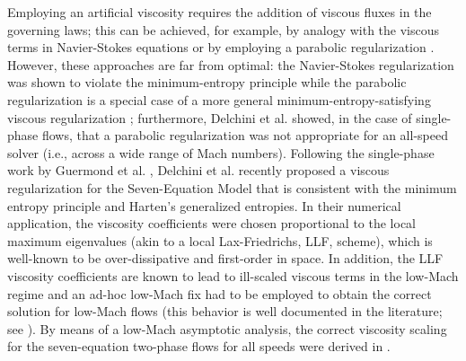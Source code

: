 \documentclass[preprint,10pt]{elsarticle}
\begin{document}
Employing an artificial viscosity requires the addition of viscous fluxes in the governing laws; this can be achieved, for example, by analogy with 
the viscous terms in Navier-Stokes equations \cite{Pasquetti_NS2006, GuermondJCP2011} or by employing a parabolic regularization \cite{PertheneNumMath1996-parabolic}. 
However, these approaches are far from optimal:
the Navier-Stokes regularization was shown to violate the minimum-entropy principle while the parabolic regularization is a special case of a more general
minimum-entropy-satisfying viscous regularization \cite{GuermondSIAM2014}; furthermore, Delchini et al. \cite{DelchiniCompFluid2014-euler} 
showed, in the case of single-phase flows, that a parabolic regularization was not appropriate for an all-speed solver (i.e., across a wide range of Mach numbers).
%
Following the single-phase work by Guermond et al. 
\cite{GuermondSIAM2014, GuermondCSE2011,  GuermondJCP2011, GuermondCRA2008, GuermondSIAM2014}, 
Delchini et al. \cite{Marco_paper_sem} recently proposed a viscous regularization for the Seven-Equation Model that is consistent with the minimum entropy principle and Harten's generalized entropies. In their numerical application, the viscosity coefficients were chosen proportional to the local maximum eigenvalues (akin to a local Lax-Friedrichs, LLF, scheme), which is well-known to be over-dissipative and first-order in space. In addition, the LLF viscosity coefficients are known to
lead to ill-scaled viscous terms in the low-Mach regime and an ad-hoc low-Mach fix had to be employed to obtain the correct solution for low-Mach flows (this 
behavior is well documented in the literature; see \cite{LowMach1, LowMach2, LowMach3}). By means of a low-Mach asymptotic analysis, the correct
viscosity scaling for the seven-equation two-phase flows for all speeds were derived in \cite{Marco_paper_sem}.
\end{document}
